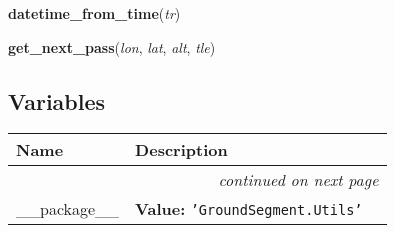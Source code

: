     \vspace{0.5ex}

\hspace{.8\funcindent}\begin{boxedminipage}{\funcwidth}

    \raggedright \textbf{datetime\_from\_time}(\textit{tr})

\setlength{\parskip}{2ex}
\setlength{\parskip}{1ex}
    \end{boxedminipage}

    \label{GroundSegment:Utils:UtilsFunctions:get_next_pass}

    \vspace{0.5ex}

\hspace{.8\funcindent}\begin{boxedminipage}{\funcwidth}

    \raggedright \textbf{get\_next\_pass}(\textit{lon}, \textit{lat}, \textit{alt}, \textit{tle})

\setlength{\parskip}{2ex}
\setlength{\parskip}{1ex}
    \end{boxedminipage}



  \subsection{Variables}

    \vspace{-1cm}
\hspace{\varindent}\begin{longtable}{|p{\varnamewidth}|p{\vardescrwidth}|l}
\cline{1-2}
\cline{1-2} \centering \textbf{Name} & \centering \textbf{Description}& \\
\cline{1-2}
\endhead\cline{1-2}\multicolumn{3}{r}{\small\textit{continued on next page}}\\\endfoot\cline{1-2}
\endlastfoot\raggedright \_\-\_\-p\-a\-c\-k\-a\-g\-e\-\_\-\_\- & \raggedright \textbf{Value:} 
{\tt \texttt{'}\texttt{GroundSegment.Utils}\texttt{'}}&\\
\cline{1-2}
\end{longtable}

